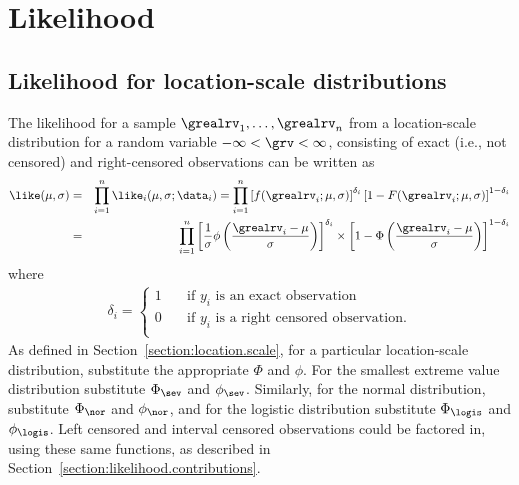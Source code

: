\section{Likelihood}
\label{section:likelihood.for.lc.base}
\subsection{Likelihood for location-scale distributions}
\label{section:likelihood.for.locscale}

The likelihood for a sample $\grealrv_{1},\ldots , \grealrv_{n}$ from
a location-scale distribution for a random variable $-\infty < \grv <
\infty$, consisting of exact (i.e., not censored) and
right-censored observations can be written as
\begin{eqnarray*}
\like(\mu,\sigma) &=& \prod_{i=1}^{n} \like_{i}(\mu, \sigma;\data_{i})
=   \prod_{i=1}^{n}    
 \left [ 
 f(\grealrv_{i};\mu,\sigma)
\right ]^{\delta_{i}} 
\left [1- F(\grealrv_{i};\mu,\sigma) \right]^{1-\delta_{i}}
\\
&=&  \prod_{i=1}^{n}
\left[ \frac{1}{\sigma} \phi
\left(\frac{\grealrv_{i} -\mu}{\sigma}
\right)
\right]^{\delta_{i}}
 \times 
\left[1- \Phi \left(\frac{ \grealrv_{i} -\mu}{\sigma}
\right) \right]^{1-\delta_{i}}
\end{eqnarray*}
where
\begin{eqnarray*}
\delta_{i}= \left \{
     \begin{array}{lll}
	1 & \quad \mbox{if $y_{i}$ is an exact observation} \\
        0 & \quad \mbox{if $y_{i}$ is a right censored  observation.} \\
     \end{array}
            \right .
\end{eqnarray*}
As defined in Section~\ref{section:location.scale},
for a particular location-scale distribution, substitute the
appropriate $\Phi$ and $\phi$.  For the smallest extreme value
distribution substitute $\Phi_{\sev}$ and $\phi_{\sev}$. Similarly,
for the normal distribution, substitute $\Phi_{\nor}$ and $\phi_{\nor}$,
and for the logistic distribution substitute $\Phi_{\logis}$ and $
\phi_{\logis}$.
Left censored and interval censored observations could be factored in,
using these same functions, as described in
Section~\ref{section:likelihood.contributions}.

